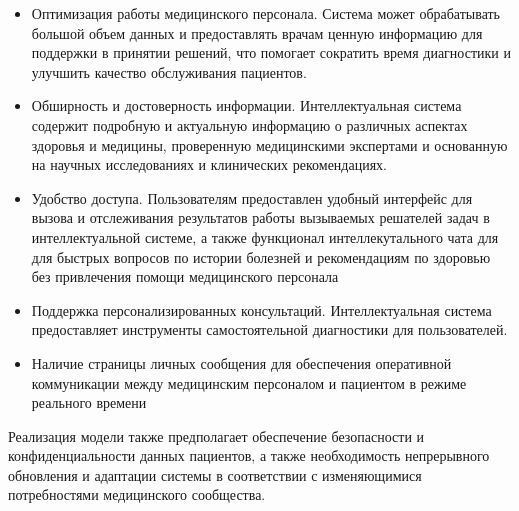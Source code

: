 \begin{itemize}
    \item Оптимизация работы медицинского персонала. Система может обрабатывать большой объем данных и предоставлять врачам ценную информацию для поддержки в принятии решений, что помогает сократить время диагностики и улучшить качество обслуживания пациентов.
    \item Обширность и достоверность информации. Интеллектуальная система содержит подробную и актуальную информацию о различных аспектах здоровья и медицины, проверенную медицинскими экспертами и основанную на научных исследованиях и клинических рекомендациях.
    \item Удобство доступа. Пользователям предоставлен удобный интерфейс для вызова и отслеживания результатов работы вызываемых решателей задач в интеллектуальной системе, а также функционал интеллекутального чата для для быстрых вопросов по истории болезней и рекомендациям по здоровью без привлечения помощи медицинского персонала
    \item Поддержка персонализированных консультаций. Интеллектуальная система предоставляет инструменты самостоятельной диагностики для пользователей.
    \item Наличие страницы личных сообщения для обеспечения оперативной коммуникации между медицинским персоналом и пациентом в режиме реального времени
\end{itemize}

Реализация модели также предполагает обеспечение безопасности и конфиденциальности данных пациентов, а также необходимость непрерывного обновления и адаптации системы в соответствии с изменяющимися потребностями медицинского сообщества.

